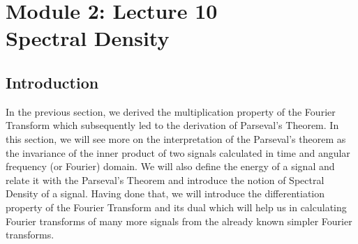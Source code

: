 \section{Module 2: Lecture 10\\Spectral Density}

\subsection{Introduction}
	In the previous section, we derived the multiplication property of the Fourier Transform which subsequently led to the derivation of Parseval’s Theorem. 
	In this section, we will see more on the interpretation of the Parseval’s theorem as the invariance of the inner product of two signals calculated in time and angular frequency (or Fourier) domain. 
	We will also define the energy of a signal and relate it with the Parseval’s Theorem and introduce the notion of Spectral Density of a signal.
	Having done that, we will introduce the differentiation property of the Fourier Transform and its dual which will help us in calculating Fourier transforms of many more signals from the already known simpler Fourier transforms.
